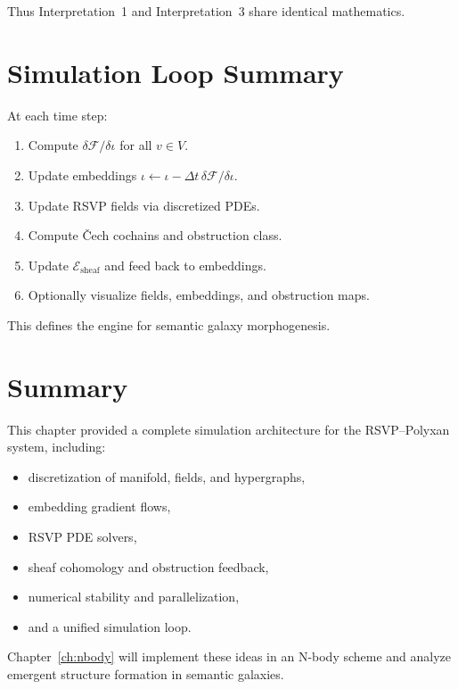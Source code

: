 Thus Interpretation~1 and Interpretation~3 share identical mathematics.


\section{Simulation Loop Summary}

At each time step:

\begin{enumerate}
\item Compute $\delta\mathcal{F}/\delta \iota$ for all $v\in V$.
\item Update embeddings $\iota \gets \iota - \Delta t\,\delta\mathcal{F}/\delta\iota$.
\item Update RSVP fields via discretized PDEs.
\item Compute Čech cochains and obstruction class.
\item Update $\mathcal{E}_{\mathrm{sheaf}}$ and feed back to embeddings.
\item Optionally visualize fields, embeddings, and obstruction maps.
\end{enumerate}

This defines the engine for semantic galaxy morphogenesis.


\section{Summary}

This chapter provided a complete simulation architecture for the RSVP--Polyxan
system, including:

\begin{itemize}
  \item discretization of manifold, fields, and hypergraphs,
  \item embedding gradient flows,
  \item RSVP PDE solvers,
  \item sheaf cohomology and obstruction feedback,
  \item numerical stability and parallelization,
  \item and a unified simulation loop.
\end{itemize}

Chapter~\ref{ch:nbody} will implement these ideas in an N-body
scheme and analyze emergent structure formation in semantic galaxies.
